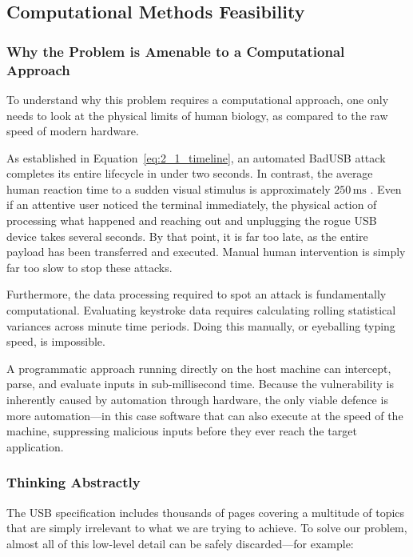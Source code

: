 \subsection{Computational Methods Feasibility}

\subsubsection{Why the Problem is Amenable to a Computational Approach}

To understand why this problem requires a computational approach, one only needs to look at the physical limits of human biology, as compared to the raw speed of modern hardware.

As established in Equation~\ref{eq:2_1_timeline}, an automated BadUSB attack completes its entire lifecycle in under two seconds. In contrast, the average human reaction time to a sudden visual stimulus is approximately $250\,\text{ms}$ \cite{thorpe1996speed}. Even if an attentive user noticed the terminal immediately, the physical action of processing what happened and reaching out and unplugging the rogue USB device takes several seconds. By that point, it is far too late, as the entire payload has been transferred and executed. Manual human intervention is simply far too slow to stop these attacks.

Furthermore, the data processing required to spot an attack is fundamentally computational. Evaluating keystroke data requires calculating rolling statistical variances across minute time periods. Doing this manually, or eyeballing typing speed, is impossible.

A programmatic approach running directly on the host machine can intercept, parse, and evaluate inputs in sub-millisecond time. Because the vulnerability is inherently caused by automation through hardware, the only viable defence is more automation---in this case software that can also execute at the speed of the machine, suppressing malicious inputs before they ever reach the target application.

\subsubsection{Thinking Abstractly}

The USB specification includes thousands of pages covering a multitude of topics that are simply irrelevant to what we are trying to achieve. To solve our problem, almost all of this low-level detail can be safely discarded---for example:

